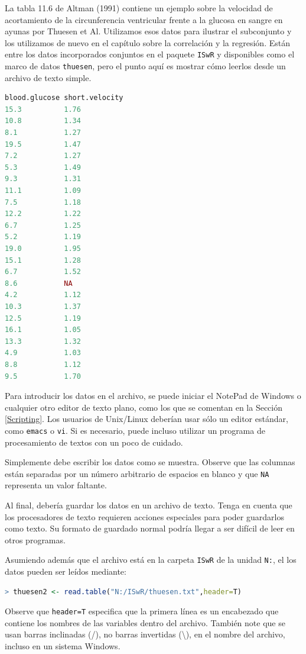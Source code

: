 La tabla 11.6 de Altman (1991) contiene un ejemplo sobre la velocidad de
acortamiento de la circunferencia ventricular frente a la glucosa en sangre en
ayunas por Thuesen et Al. Utilizamos esos datos para ilustrar el subconjunto y
los utilizamos de nuevo en el capítulo sobre la correlación y la regresión.
Están entre los datos incorporados conjuntos en el paquete \texttt{ISwR} y
disponibles como el marco de datos \texttt{thuesen}, pero el punto aquí es
mostrar cómo leerlos desde un archivo de texto simple.

\begin{lstlisting}[language=R]
blood.glucose short.velocity
15.3          1.76
10.8          1.34
8.1           1.27
19.5          1.47
7.2           1.27
5.3           1.49
9.3           1.31
11.1          1.09
7.5           1.18
12.2          1.22
6.7           1.25
5.2           1.19
19.0          1.95
15.1          1.28
6.7           1.52
8.6           NA
4.2           1.12
10.3          1.37
12.5          1.19
16.1          1.05
13.3          1.32
4.9           1.03
8.8           1.12
9.5           1.70
\end{lstlisting}

Para introducir los datos en el archivo, se puede iniciar el NotePad de Windows
o cualquier otro editor de texto plano, como los que se comentan en la
Sección \ref{Scripting}. Los usuarios de Unix/Linux deberían usar sólo un editor
estándar, como \texttt{emacs} o \texttt{vi}. Si es necesario, puede incluso
utilizar un programa de procesamiento de textos con un poco de cuidado.

Simplemente debe escribir los datos como se muestra. Observe que las columnas
están separadas por un número arbitrario de espacios en blanco y que \texttt{NA}
representa un valor faltante.

Al final, debería guardar los datos en un archivo de texto. Tenga en cuenta que
los procesadores de texto requieren acciones especiales para poder guardarlos
como texto. Su formato de guardado normal podría llegar a ser difícil de leer en
otros programas.

Asumiendo además que el archivo está en la carpeta \texttt{ISwR} de la unidad
\texttt{N:}, el los datos pueden ser leídos mediante:

\begin{lstlisting}[language=R]
> thuesen2 <- read.table("N:/ISwR/thuesen.txt",header=T)
\end{lstlisting}

Observe que \texttt{header=T} especifica que la primera línea es un encabezado que
contiene los nombres de las variables dentro del archivo. También note que
se usan barras inclinadas (/), no barras invertidas (\textbackslash), en el nombre del
archivo, incluso en un sistema Windows.

